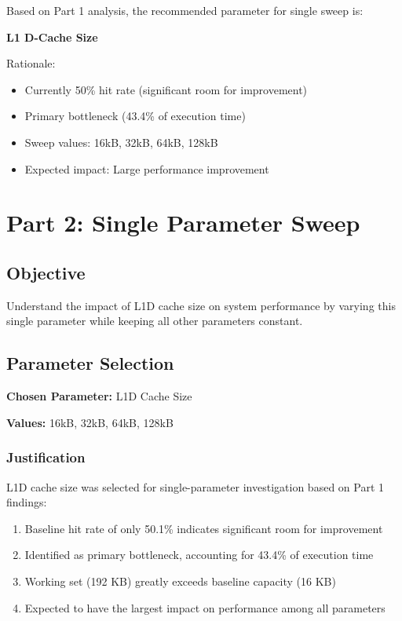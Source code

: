 \documentclass[11pt,a4paper]{article}
\begin{document}
Based on Part 1 analysis, the recommended parameter for single sweep is:

\textbf{L1 D-Cache Size} 

Rationale:
\begin{itemize}[noitemsep]
    \item Currently 50\% hit rate (significant room for improvement)
    \item Primary bottleneck (43.4\% of execution time)
    \item Sweep values: 16kB, 32kB, 64kB, 128kB
    \item Expected impact: Large performance improvement
\end{itemize}


\newpage

\section{Part 2: Single Parameter Sweep}

\subsection{Objective}
Understand the impact of L1D cache size on system performance by varying this single parameter while keeping all other parameters constant.

\subsection{Parameter Selection}

\textbf{Chosen Parameter:} L1D Cache Size

\textbf{Values:} 16kB, 32kB, 64kB, 128kB

\subsubsection{Justification}

L1D cache size was selected for single-parameter investigation based on Part 1 findings:
\begin{enumerate}[noitemsep]
    \item Baseline hit rate of only 50.1\% indicates significant room for improvement
    \item Identified as primary bottleneck, accounting for 43.4\% of execution time
    \item Working set (192 KB) greatly exceeds baseline capacity (16 KB)
    \item Expected to have the largest impact on performance among all parameters
\end{enumerate}
\end{document}

